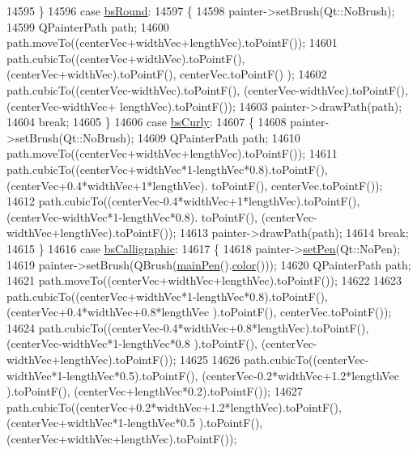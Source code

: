 \begin{DoxyCode}
14595       \}
14596       \textcolor{keywordflow}{case} \hyperlink{a00033_a7ac3afd0b24a607054e7212047d59dbda394627b0830a26ee3e0a02ca67a9f918}{bsRound}:
14597       \{
14598         painter->setBrush(Qt::NoBrush);
14599         QPainterPath path;
14600         path.moveTo((centerVec+widthVec+lengthVec).toPointF());
14601         path.cubicTo((centerVec+widthVec).toPointF(), (centerVec+widthVec).toPointF(), centerVec.toPointF()
      );
14602         path.cubicTo((centerVec-widthVec).toPointF(), (centerVec-widthVec).toPointF(), (centerVec-widthVec+
      lengthVec).toPointF());
14603         painter->drawPath(path);
14604         \textcolor{keywordflow}{break};
14605       \}
14606       \textcolor{keywordflow}{case} \hyperlink{a00033_a7ac3afd0b24a607054e7212047d59dbda5024ce4023c2d8de4221f1cd4816acd8}{bsCurly}:
14607       \{
14608         painter->setBrush(Qt::NoBrush);
14609         QPainterPath path;
14610         path.moveTo((centerVec+widthVec+lengthVec).toPointF());
14611         path.cubicTo((centerVec+widthVec*1-lengthVec*0.8).toPointF(), (centerVec+0.4*widthVec+1*lengthVec).
      toPointF(), centerVec.toPointF());
14612         path.cubicTo((centerVec-0.4*widthVec+1*lengthVec).toPointF(), (centerVec-widthVec*1-lengthVec*0.8).
      toPointF(), (centerVec-widthVec+lengthVec).toPointF());
14613         painter->drawPath(path);
14614         \textcolor{keywordflow}{break};
14615       \}
14616       \textcolor{keywordflow}{case} \hyperlink{a00033_a7ac3afd0b24a607054e7212047d59dbda8f29f5ef754e2dc9a9efdedb2face0f3}{bsCalligraphic}:
14617       \{
14618         painter->\hyperlink{a00047_af9c7a4cd1791403901f8c5b82a150195}{setPen}(Qt::NoPen);
14619         painter->setBrush(QBrush(\hyperlink{a00033_a8df4ad873bf88a4a7bfb9bbbd490e495}{mainPen}().\hyperlink{a00116_ae35093fbf4f645dcefd930ca8c68b622}{color}()));
14620         QPainterPath path;
14621         path.moveTo((centerVec+widthVec+lengthVec).toPointF());
14622         
14623         path.cubicTo((centerVec+widthVec*1-lengthVec*0.8).toPointF(), (centerVec+0.4*widthVec+0.8*lengthVec
      ).toPointF(), centerVec.toPointF());
14624         path.cubicTo((centerVec-0.4*widthVec+0.8*lengthVec).toPointF(), (centerVec-widthVec*1-lengthVec*0.8
      ).toPointF(), (centerVec-widthVec+lengthVec).toPointF());
14625         
14626         path.cubicTo((centerVec-widthVec*1-lengthVec*0.5).toPointF(), (centerVec-0.2*widthVec+1.2*lengthVec
      ).toPointF(), (centerVec+lengthVec*0.2).toPointF());
14627         path.cubicTo((centerVec+0.2*widthVec+1.2*lengthVec).toPointF(), (centerVec+widthVec*1-lengthVec*0.5
      ).toPointF(), (centerVec+widthVec+lengthVec).toPointF());

\end{DoxyCode}
